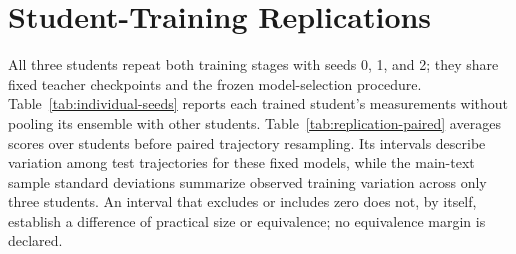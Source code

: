 \section{Student-Training Replications}\label{app:replications}
\begin{table}[t]
\caption{Individual student-training replications under the frozen protocol. The evaluation sampling seed and test cases are shared; each student repeats both training stages with its own training seed.}
\label{tab:individual-seeds}
\centering
{}
\end{table}
\begin{table}[t]
\caption{Three-student mean CRPS differences from each fixed 64-step solver reference, with 95\% paired trajectory-bootstrap intervals.}
\label{tab:replication-paired}
\centering
{}
\end{table}
All three students repeat both training stages with seeds 0, 1, and 2; they share fixed teacher checkpoints and the frozen model-selection procedure. Table~\ref{tab:individual-seeds} reports each trained student's measurements without pooling its ensemble with other students. Table~\ref{tab:replication-paired} averages scores over students before paired trajectory resampling. Its intervals describe variation among test trajectories for these fixed models, while the main-text sample standard deviations summarize observed training variation across only three students. An interval that excludes or includes zero does not, by itself, establish a difference of practical size or equivalence; no equivalence margin is declared. 

